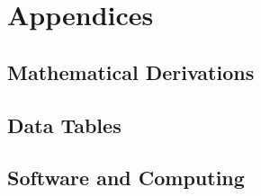 \documentclass[../../thesis.tex]{subfiles}
\begin{document}
\makeatletter
\@openrightfalse
\makeatother

\appendix
\chapter*{Appendices}
\setcounter{section}{0}
\renewcommand{\thesection}{\Alph{section}}
\renewcommand{\thesubsection}{\thesection.\Alph{subsection}}
\renewcommand{\thesubsubsection}{\thesubsection.\Alph{subsubsection}}
\renewcommand{\theHsection}{appendix.\thesection}
\renewcommand{\theHsubsection}{appendix.\thesubsection}
\renewcommand{\theHsubsubsection}{appendix.\thesubsubsection}
\renewcommand{\sectionmark}[1]{\markboth{Appendix \thesection}{}}
\renewcommand{\topfraction}{0.9}
\renewcommand{\bottomfraction}{0.8}
\renewcommand{\textfraction}{0.07}
\renewcommand{\floatpagefraction}{0.8}
\setcounter{topnumber}{3}
\setcounter{bottomnumber}{2}
\setcounter{totalnumber}{4}

\section{Mathematical Derivations}
\label{sec:APPENDIX_DERIVATIONS}


\section{Data Tables}
\label{sec:APPENDIX_TABLES}


\section{Software and Computing}
\label{sec:APPENDIX_SOFTWARE}

\end{document}
